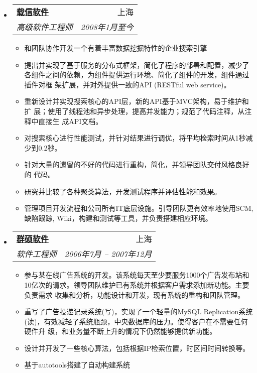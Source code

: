 \documentclass[letterpaper,11pt]{article}
\makeatletter
\newcommand{\resitem}[1]{\item #1 \vspace{-2pt}}
\newcommand{\ressubheading}[4]{
\begin{tabular*}{6.5in}{l@{\extracolsep{\fill}}r}
		\textbf{#1} & #2 \\
		\textit{#3} & \textit{#4} \\
\end{tabular*}\vspace{-6pt}}
\makeatother
\begin{document}
\begin{itemize}
\item
  \ressubheading{\href{http://www.izenesoft.com/EN/home.html}{载信软件}}{上海}{%
    高级软件工程师}{2008年1月至今}

  { \footnotesize
    \begin{itemize}
      \resitem{和团队协作开发一个有着丰富数据挖掘特性的企业搜索引擎}

      \resitem{提出并实现了基于服务的分布式框架，简化了程序的部署和配置，减少了
        各组件之间的依赖，为组件提供运行环境、简化了组件的开发，组件通过插件对框
        架扩展，并对外提供一致的API (RESTful web service)。}

      \resitem{重新设计并实现搜索核心的API层，新的API基于MVC架构，易于维护和扩
        展；使用了线程池和异步处理，提高并发能力；规范了代码注释，从注释中直接生
        成API文档。}

      \resitem{对搜索核心进行性能测试，并针对结果进行调优，将平均检索时间从1秒减
        少到0.2秒。}

      \resitem{针对大量的遗留的不好的代码进行重构，简化，并领导团队交付风格良好的
        代码。}

      \resitem{研究并比较了各种聚类算法，开发测试程序并评估性能和效果。}

      \resitem{管理项目开发流程和公司所有IT底层设施。引导团队更有效率地使用SCM,
        缺陷跟踪, Wiki，构建和测试等工具，并负责搭建相应环境。}

    \end{itemize}
  }

\item \ressubheading{\href{http://www.augmentum.com/}{群硕软件}}{上海}{%
  软件工程师}{2006年7月 -- 2007年12月}

  { \footnotesize
    \begin{itemize}
      \resitem{参与某在线广告系统的开发。该系统每天至少要服务1000个广告发布站和
        10亿次的请求。领导团队维护已有系统并根据客户需求添加新功能。主要负责需求
        收集和分析，功能设计和开发，现有系统的重构和团队管理。}

      \resitem{重写了广告投递记录系统(写)，实现了一个轻量的MySQL Replication系统
        (读)，有效减轻了系统瓶颈，中央数据库的压力。使得客户在不需要任何硬件升
        级，和业务量不断上升的情况下仍然能够提供新功能。}

      \resitem{设计并开发了一些核心算法，包括根据IP检索位置，时区间时间转换等。}

      \resitem{基于autotools搭建了自动构建系统}

    \end{itemize}
  }
\end{itemize}
\end{document}
